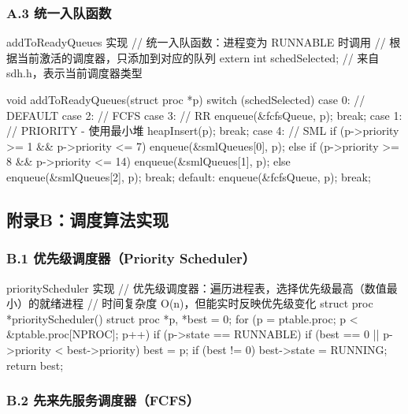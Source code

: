 \documentclass[a4paper, 12pt]{article}
\begin{document}
    \subsubsection{A.3 统一入队函数}
    
    \begin{codeblock}{addToReadyQueues 实现}
// 统一入队函数：进程变为 RUNNABLE 时调用
// 根据当前激活的调度器，只添加到对应的队列
extern int schedSelected; // 来自 sdh.h，表示当前调度器类型

void addToReadyQueues(struct proc *p) {
    switch (schedSelected) {
    case 0: // DEFAULT
    case 2: // FCFS
    case 3: // RR
        enqueue(&fcfsQueue, p);
        break;
    case 1: // PRIORITY - 使用最小堆
        heapInsert(p);
        break;
    case 4: // SML
        if (p->priority >= 1 && p->priority <= 7) {
            enqueue(&smlQueues[0], p);
        } else if (p->priority >= 8 && p->priority <= 14) {
            enqueue(&smlQueues[1], p);
        } else {
            enqueue(&smlQueues[2], p);
        }
        break;
    default:
        enqueue(&fcfsQueue, p);
        break;
    }
}
    \end{codeblock}
    
    \subsection{附录B：调度算法实现}
    
    \subsubsection{B.1 优先级调度器（Priority Scheduler）}
    
    \begin{codeblock}{priorityScheduler 实现}
// 优先级调度器：遍历进程表，选择优先级最高（数值最小）的就绪进程
// 时间复杂度 O(n)，但能实时反映优先级变化
struct proc *priorityScheduler() {
    struct proc *p, *best = 0;
    for (p = ptable.proc; p < &ptable.proc[NPROC]; p++) {
        if (p->state == RUNNABLE) {
            if (best == 0 || p->priority < best->priority)
                best = p;
        }
    }
    if (best != 0) best->state = RUNNING;
    return best;
}
    \end{codeblock}
    
    \subsubsection{B.2 先来先服务调度器（FCFS）}
    
\end{document}
